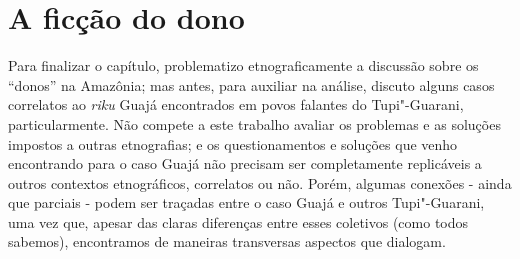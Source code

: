 \section{A ficção do dono}

Para finalizar o capítulo, problematizo etnograficamente a discussão
sobre os ``donos'' na Amazônia; mas antes, para auxiliar na análise,
discuto alguns casos correlatos ao \emph{riku} Guajá encontrados em
povos falantes do Tupi"-Guarani, particularmente. Não compete a este
trabalho avaliar os problemas e as soluções impostos a outras
etnografias; e os questionamentos e soluções que venho encontrando para
o caso Guajá não precisam ser completamente replicáveis a outros
contextos etnográficos, correlatos ou não. Porém, algumas conexões -
ainda que parciais - podem ser traçadas entre o caso Guajá e outros
Tupi"-Guarani, uma vez que, apesar das claras diferenças entre esses
coletivos (como todos sabemos), encontramos de maneiras transversas
aspectos que dialogam.

